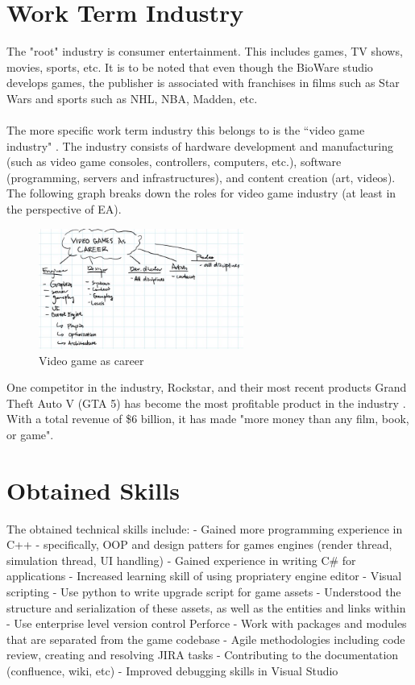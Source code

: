 \documentclass[10pt,letterpaper]{article}
\begin{document}
\section{Work Term Industry}\label{work-term-industry}

The "root" industry is consumer entertainment. This includes games, TV shows, movies, sports, etc. It is to be noted that even though the BioWare studio develops games, the publisher is associated with franchises in films such as Star Wars and sports such as NHL, NBA, Madden, etc.\\
\\
The more specific work term industry this belongs to is the ``video game industry" \cite{video-game-industry}. The industry consists of hardware development and manufacturing (such as video game consoles, controllers, computers, etc.), software (programming, servers and infrastructures), and content creation (art, videos). The following graph breaks down the roles for video game industry \cite{EA-intern-conf-2} (at least in the perspective of EA).

\begin{figure}[H]
\centering
\includegraphics[width=0.6\textwidth]{assets/video-games-career-roles}
\caption{Video game as career}
\end{figure}

One competitor in the industry, Rockstar, and their most recent products Grand Theft Auto V (GTA 5) has become the most profitable product in the industry \cite{IGN-gta5}. With a total revenue of \$6 billion, it has made "more money than any film, book, or game".

\section{Obtained Skills}\label{obtained-skills}

The obtained technical skills include:
- Gained more programming experience in C++
	- specifically, OOP and design patters for games engines (render thread, simulation thread, UI handling)
- Gained experience in writing C\# for applications
- Increased learning skill of using propriatery engine editor
- Visual scripting
- Use python to write upgrade script for game assets
- Understood the structure and serialization of these assets, as well as the entities and links within
- Use enterprise level version control Perforce
- Work with packages and modules that are separated from the game codebase
- Agile methodologies including code review, creating and resolving JIRA tasks
- Contributing to the documentation (confluence, wiki, etc)
- Improved debugging skills in Visual Studio
\end{document}

